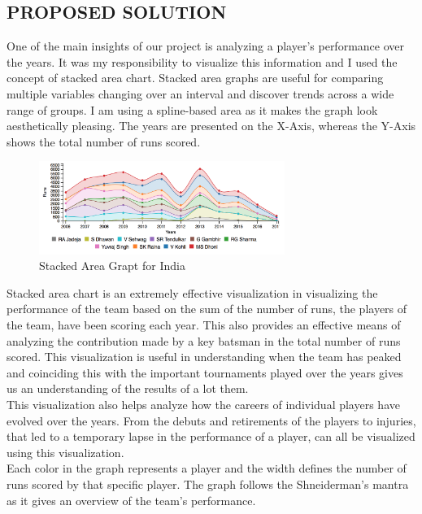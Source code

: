 \documentclass[letterpaper,10pt]{article}
\begin{document}
\begin{multicols}{2}
\section{PROPOSED SOLUTION}
One of the main insights of our project is analyzing a player’s performance over the years. It was my responsibility to visualize this information and I used the concept of stacked area chart. Stacked area graphs are useful for comparing multiple variables changing over an interval and discover trends across a wide range of groups. I am using a spline-based area as it makes the graph look aesthetically pleasing. The years are presented on the X-Axis, whereas the Y-Axis shows the total number of runs scored.
\begin{figure}[H]
\begin{center}
{\includegraphics[width = 8cm]{stacked_area_chart.png}
\caption{Stacked Area Grapt for India}
}
\end{center}
\end{figure}
Stacked area chart is an extremely effective visualization in visualizing the performance of the team based on the sum of the number of runs, the players of the team, have been scoring each year. This also provides an effective means of analyzing the contribution made by a key batsman in the total number of runs scored. This visualization is useful in understanding when the team has peaked and coinciding this with the important tournaments played over the years gives us an understanding of the results of a lot them.\\
This visualization also helps analyze how the careers of individual players have evolved over the years. From the debuts and retirements of the players to injuries, that led to a temporary lapse in the performance of a player, can all be visualized using this visualization. \\
Each color in the graph represents a player and the width defines the number of runs scored by that specific player. The graph follows the Shneiderman's mantra as it gives an overview of the team's performance.


\end{multicols}
\end{document}
